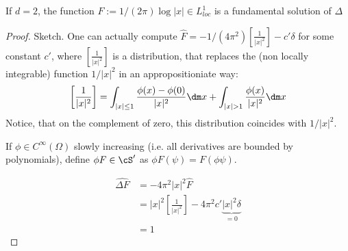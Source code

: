 	\begin{proposition}
		If $d = 2$, the function $F := 1/(2\pi) \log |x| \in L^1_{loc}$ is a fundamental solution of $\Delta$    
	\end{proposition}
	\begin{proof} Sketch.
		One can actually compute $\hat F = -1 / (4\pi^2) \left [\frac{1}{|x|^2} \right] - c' \delta$ for some constant $c'$, where  $\left [\frac{1}{|x|^2} \right]$ is a distribution, that replaces the (non locally integrable) function $1  / |x|^2$ in an appropositioniate way:
		\[
		\left [\frac{1}{|x|^2} \right] = \int_{|x| \le 1} \frac{\phi(x) - \phi(0)}{|x|^2} \dm x + \int_{|x| > 1} \frac{\phi(x)}{|x|^2} \dm x 
		\]
		Notice, that on the complement of zero, this distribution coincides with $1 / |x|^2$.
		\begin{notation}
			If $\phi \in C^\infty(\Omega)$ slowly increasing (i.e. all derivatives are bounded by polynomials), define $\phi F \in \cS'$ as $\phi F(\psi) = F(\phi \psi)$.
		\end{notation}
		\begin{align*}
			\widehat{ \Delta F} &= -4 \pi^2 |x|^2 \hat F\\
			&=  |x|^2 \left [\frac{1}{|x|^2} \right] - 4\pi^2 c' \underbrace{|x|^2 \delta}_{=0} \\
			&= 1
		\end{align*}
	\end{proof}
